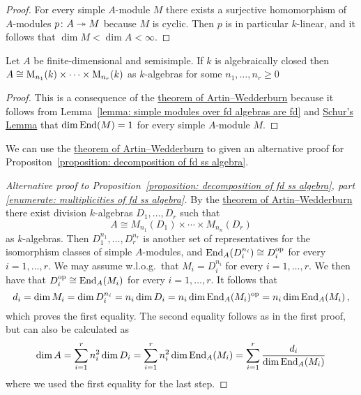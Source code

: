 \begin{proof}
  For every simple $A$-module $M$ there exists a surjective homomorphism of $A$-modules $p \colon A \twoheadrightarrow M$ because $M$ is cyclic.
  Then $p$ is in particular $k$-linear, and it follows that $\dim M < \dim A < \infty$.
\end{proof}


\begin{corollary}
  \label{corollary: semisimple algebra product of matrix algebras}
  Let $A$ be finite-dimensional and semisimple.
  If $k$ is algebraically closed then $A \cong \operatorname{M}_{n_1}(k) \times \dotsm \times \operatorname{M}_{n_r}(k)$ as $k$-algebras for some $n_1, \dotsc, n_r \geq 0$
\end{corollary}


\begin{proof}
  This is a consequence of the \hyperref[theorem: artin wedderburn theorem]{theorem of Artin--Wedderburn} because it follows from Lemma~\ref{lemma: simple modules over fd algebras are fd} and \hyperref[proposition: schurs lemma for modules]{Schur’s Lemma} that $\dim \operatorname{End}(M) = 1$ for every simple $A$-module $M$.
\end{proof}


\begin{fluff}
  We can use the \hyperref[theorem: artin wedderburn theorem]{theorem of Artin--Wedderburn} to given an alternative proof for Propositon~\ref{proposition: decomposition of fd ss algebra}.
\end{fluff}


\begin{proof}[Alternative proof to Proposition~\ref*{proposition: decomposition of fd ss algebra}, part \ref*{enumerate: multiplicities of fd ss algebra}]
  By the \hyperref[theorem: artin wedderburn theorem]{theorem of Artin--Wedderburn} there exist division $k$-algebras $D_1, \dotsc, D_r$ such that
  \[
          A
    \cong M_{n_1}(D_1) \times \dotsb \times M_{n_n}(D_r)
  \]
  as $k$-algebras.
  Then $D_1^{n_1}, \dotsc, D_r^{n_r}$ is another set of representatives for the isomorphism classes of simple $A$-modules, and $\operatorname{End}_A(D_i^{n_i}) \cong D_i^{\mathrm{op}}$ for every $i = 1, \dotsc, r$.
  We may assume w.l.o.g.\ that $M_i = D_i^{n_i}$ for every $i = 1, \dotsc, r$.
  We then have that $D_i^{\mathrm{op}} \cong \operatorname{End}_A(M_i)$ for every $i = 1, \dotsc, r$.
  It follows that
  \[
      d_i
    = \dim M_i
    = \dim D_i^{n_i}
    = n_i \dim D_i
    = n_i \dim \operatorname{End}_A(M_i)^{\mathrm{op}}
    = n_i \dim \operatorname{End}_A(M_i) \,,
  \]
  which proves the first equality.
  The second equality follows as in the first proof, but can also be calculated as
  \[
      \dim A
    = \sum_{i=1}^r n_i^2 \dim D_i
    = \sum_{i=1}^r n_i^2 \dim \operatorname{End}_A(M_i)
    = \sum_{i=1}^r \frac{d_i}{\dim \operatorname{End}_A(M_i)}
  \]
  where we used the first equality for the last step.
\end{proof}


